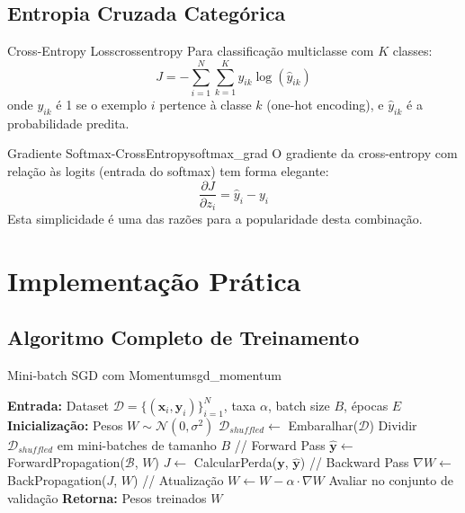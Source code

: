 \documentclass[a4paper,12pt]{article}
\newcommand{\grad}[2]{\frac{\partial #1}{\partial #2}}
\begin{document}
\subsection{Entropia Cruzada Categórica}

\begin{definicao}{Cross-Entropy Loss}{crossentropy}
Para classificação multiclasse com $K$ classes:
\[
J = -\sum_{i=1}^{N} \sum_{k=1}^{K} y_{ik} \log(\hat{y}_{ik})
\]
onde $y_{ik}$ é 1 se o exemplo $i$ pertence à classe $k$ (one-hot encoding), e $\hat{y}_{ik}$ é a probabilidade predita.
\end{definicao}

\begin{teorema}{Gradiente Softmax-CrossEntropy}{softmax_grad}
O gradiente da cross-entropy com relação às logits (entrada do softmax) tem forma elegante:
\[
\grad{J}{z_i} = \hat{y}_i - y_i
\]
Esta simplicidade é uma das razões para a popularidade desta combinação.
\end{teorema}

\section{Implementação Prática}

\subsection{Algoritmo Completo de Treinamento}

\begin{algoritmo}{Mini-batch SGD com Momentum}{sgd_momentum}
\begin{algorithm}[H]
\caption{Treinamento de Rede Neural com Mini-batch SGD}
\begin{algorithmic}[1]
\STATE \textbf{Entrada:} Dataset $\mathcal{D} = \{(\mathbf{x}_i, \mathbf{y}_i)\}_{i=1}^N$, taxa $\alpha$, batch size $B$, épocas $E$
\STATE \textbf{Inicialização:} Pesos $W \sim \mathcal{N}(0, \sigma^2)$
    \STATE $\mathcal{D}_{shuffled} \leftarrow$ Embaralhar($\mathcal{D}$)
    \STATE Dividir $\mathcal{D}_{shuffled}$ em mini-batches de tamanho $B$
        \STATE // Forward Pass
        \STATE $\hat{\mathbf{y}} \leftarrow$ ForwardPropagation($\mathcal{B}$, $W$)
        \STATE $J \leftarrow$ CalcularPerda($\mathbf{y}$, $\hat{\mathbf{y}}$)
        \STATE // Backward Pass
        \STATE $\nabla W \leftarrow$ BackPropagation($J$, $W$)
        \STATE // Atualização
        \STATE $W \leftarrow W - \alpha \cdot \nabla W$
    \ENDFOR
    \STATE Avaliar no conjunto de validação
\ENDFOR
\STATE \textbf{Retorna:} Pesos treinados $W$
\end{algorithmic}
\end{algorithm}
\end{algoritmo}
\end{document}
